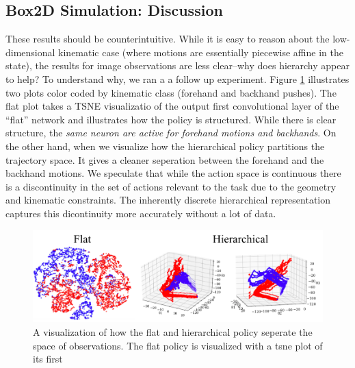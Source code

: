 \subsection*{Box2D Simulation: Discussion}
These results should be counterintuitive. While it is easy to reason about the low-dimensional kinematic case (where motions are essentially piecewise affine in the state), the results for image observations are less clear--why does hierarchy appear to help? 
To understand why, we ran a a follow up experiment. 
Figure \ref{fig:tsne} illustrates two plots color coded by kinematic class (forehand and backhand pushes).
The flat plot takes a TSNE visualizatio of the output first convolutional layer of the ``flat'' network and illustrates how the policy is structured. 
While there is clear structure, the \emph{same neuron are active for forehand motions and backhands}. On the other hand, when we visualize how the hierarchical policy partitions the trajectory space. It gives a cleaner seperation between the forehand and the backhand motions.
We speculate that while the action space is continuous there is a discontinuity in the set of actions relevant to the task due to the geometry and kinematic constraints.
The inherently discrete hierarchical representation captures this dicontinuity more accurately without a lot of data.

\begin{figure} [ht!]
\centering
    \includegraphics[width=\textwidth]{ddco-experiments/tsne.png}
    \caption{A visualization of how the flat and hierarchical policy seperate the space of observations. The flat policy is visualized with a tsne plot of its first\label{fig:tsne}}
\end{figure}

